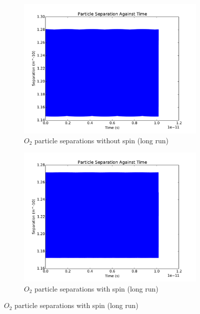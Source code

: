 \documentclass[12pt]{article}
\begin{document}
	\begin{figure}[H]
		\centering
		\begin{subfigure}{0.45\textwidth}
			\includegraphics[width=\textwidth]{oxnospinlong}
			\caption*{$O_2$ particle separations without spin (long run)}
		\end{subfigure}
		\begin{subfigure}{0.45\textwidth}
			\includegraphics[width=\textwidth]{oxspinlong}
			\caption*{$O_2$ particle separations with spin (long run)}
		\end{subfigure}
	\end{figure}
	
\end{document}
